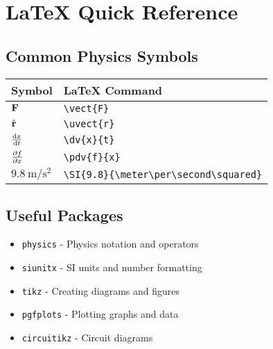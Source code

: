\documentclass[11pt]{book}
\begin{document}
\backmatter

\appendix

\chapter{LaTeX Quick Reference}

\section{Common Physics Symbols}
\begin{tabular}{ll}
    \toprule
    Symbol & LaTeX Command \\
    \midrule
    $\mathbf{F}$ & \texttt{\textbackslash vect\{F\}} \\
    $\hat{\mathbf{r}}$ & \texttt{\textbackslash uvect\{r\}} \\
    $\dv{x}{t}$ & \texttt{\textbackslash dv\{x\}\{t\}} \\
    $\pdv{f}{x}$ & \texttt{\textbackslash pdv\{f\}\{x\}} \\
    $\SI{9.8}{\meter\per\second\squared}$ & \texttt{\textbackslash SI\{9.8\}\{\textbackslash meter\textbackslash per\textbackslash second\textbackslash squared\}} \\
    \bottomrule
\end{tabular}

\section{Useful Packages}
\begin{itemize}
    \item \texttt{physics} - Physics notation and operators
    \item \texttt{siunitx} - SI units and number formatting
    \item \texttt{tikz} - Creating diagrams and figures
    \item \texttt{pgfplots} - Plotting graphs and data
    \item \texttt{circuitikz} - Circuit diagrams
\end{itemize}
\end{document}
